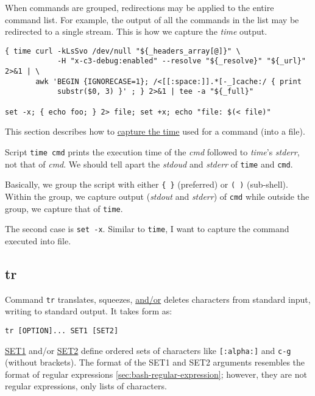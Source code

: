 When commands are grouped, redirections may be
applied to the entire command list. For example, the output of all
the commands in the list may be redirected to a single
stream. This is how we capture the \textit{time} output.

\begin{lstlisting}
{ time curl -kLsSvo /dev/null "${_headers_array[@]}" \
            -H "x-c3-debug:enabled" --resolve "${_resolve}" "${_url}" 2>&1 | \
       awk 'BEGIN {IGNORECASE=1}; /<[[:space:]].*[-_]cache:/ { print
            substr($0, 3) }' ; } 2>&1 | tee -a "${_full}"

set -x; { echo foo; } 2> file; set +x; echo "file: $(< file)"
\end{lstlisting}

This section describes how to
\href{http://mywiki.wooledge.org/BashFAQ/032}{capture the time}
used for a command (into a file).

Script \lstinline|time cmd| prints the execution time of the
\textit{cmd} followed to \textit{time}'s \textit{stderr}, not that
of \textit{cmd}. We should tell apart the \textit{stdoud} and
\textit{stderr} of \lstinline|time| and \lstinline|cmd|.

Basically, we group the script with either \lstinline|{ }|
(preferred) or \lstinline|( )| (sub-shell). Within the group, we
capture output (\textit{stdout} and \textit{stderr}) of
\lstinline|cmd| while outside the group, we capture that of
\lstinline|time|.

The second case is \lstinline|set -x|. Similar to
\lstinline|time|, I want to capture the command executed into file.

\subsection{tr}
\label{sec:bash-tr}

Command \lstinline|tr| translates, squeezes, \uline{and/or}
deletes characters from standard input, writing to standard
output. It takes form as:

\begin{lstlisting}
tr [OPTION]... SET1 [SET2]
\end{lstlisting}

\uline{SET1} and/or \uline{SET2} define ordered sets of characters
like \lstinline|[:alpha:]| and \lstinline|c-g| (without
brackets). The format of the SET1 and SET2 arguments resembles the
format of regular expressions \ref{sec:bash-regular-expression};
however, they are not regular expressions, only lists of
characters.

